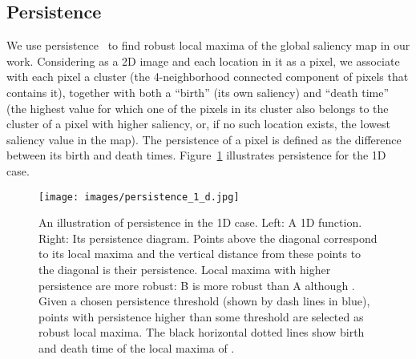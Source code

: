\documentclass[runningheads]{llncs}
\begin{document}
\subsection{Persistence}
We use persistence~\cite{Chazal2013persistence,Edelsbrunner2009introtopo,Edelsbrunner2002topo,Oudot2015persistence,Zomorodian2005compute} to find robust local maxima of the global saliency map  in our work. Considering  as a 2D image and each location in it as a pixel, we associate with each pixel a cluster (the 4-neighborhood connected component of pixels that contains it), together with both a ``birth'' (its own saliency) and ``death time'' (the highest value for which one of the pixels in its cluster also belongs to the cluster of a pixel with higher saliency, or, if no such location exists, the lowest saliency value in the map). The persistence of a pixel is defined as the difference between its birth and death times. Figure~\ref{fig:persistence} illustrates persistence for the 1D case.
\begin{figure}[htb]
    \centering
    \vspace{-10pt}
        \texttt{[image: images/persistence\_1\_d.jpg]}
	 \vspace{-5mm}
        \caption{\small An illustration of persistence in the 1D case. Left: A 1D function. Right: Its persistence diagram. Points above the diagonal correspond to its local maxima and the vertical distance from these points to the diagonal is their persistence. Local maxima with higher persistence are more robust: B is more robust than A although . Given a chosen persistence threshold (shown by dash lines in blue), points with persistence higher than some threshold are selected as robust local maxima. The black horizontal dotted lines show birth and death time of the local maxima of .}
	\vspace{-5mm}
	\label{fig:persistence}
\end{figure} 
\end{document}
